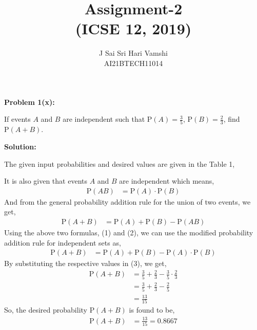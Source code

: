 \documentclass[journal,12pt,twocolumn]{article}\usepackage[margin=1.25 in]{geometry}
\title{\LARGE{\textbf{Assignment-2}\\(ICSE 12, 2019)}}
\author{\normalsize J Sai Sri Hari Vamshi\\ \footnotesize AI21BTECH11014}
\date{}
\providecommand{\pr}[1]{\ensuremath{\text{P}\left(#1\right)}}
\begin{document}
\maketitle
\begin{center}
    \textbf{\large Problem 1(x):}
\end{center}
\noindent If events $A$ and $B$ are independent such that $\pr{A} = \frac{3}{5}$, $\pr{B} = \frac{2}{3}$, find $\pr{A + B}$.

\begin{center}
    \textbf{\large Solution:}
\end{center}

\noindent The given input probabilities and desired values are given in the Table 1,
\begin{center}
\begin{table}[h!]
\label{table:table1}

\caption{}
\end{table}
\end{center}
\noindent It is also given that events $A$ and $B$ are independent which means,
\begin{align}
\pr{AB} & = \pr A \cdot \pr B
\end{align}
\noindent And from the general probability addition rule for the union of two events, we get,
\begin{align}
\pr{A + B} & = \pr A + \pr B - \pr{AB}
\end{align}
\noindent Using the above two formulas, (1) and (2), we can use the modified probability addition rule for independent sets as,
\begin{align}
\pr{A + B} & = \pr A + \pr B - \pr A \cdot \pr B
\end{align}
\noindent By substituting the respective values in (3), we get,
\begin{align*}
\pr{A + B} & = \frac{3}{5} + \frac{2}{3} - \frac{3}{5} \cdot \frac{2}{3} \\
& = \frac{3}{5} + \frac{2}{3} - \frac{2}{5}\\
& = \frac{13}{15}
\end{align*}
\noindent So, the desired probability $\pr{A + B}$ is found to be,
\begin{align*}
\pr{A + B} & = \frac{13}{15} = 0.8667
\end{align*}
\end{document}
